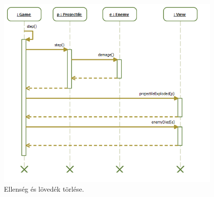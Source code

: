 \begin{figure}[H]
\begin{center}
\includegraphics[width=18cm]{images/grafikaSeq/proj_Enemy_del.png}
\caption{Ellenség és lövedék törlése.}
\label{fig:Graphic_enemy/projectile_del}
\end{center}
\end{figure}
